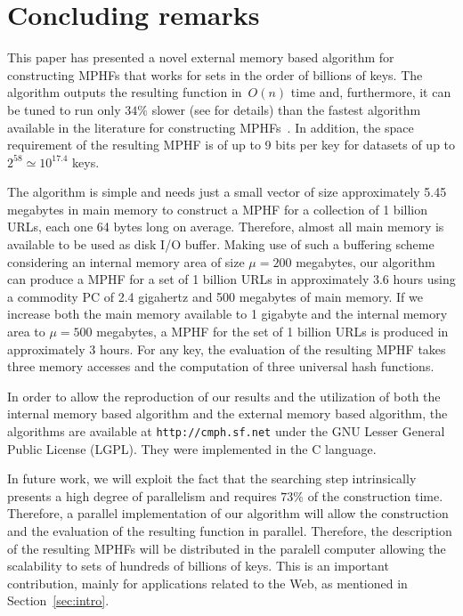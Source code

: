 \enlargethispage{2\baselineskip}
\section{Concluding remarks}
\label{sec:concuding-remarks}

This paper has presented a novel external memory based algorithm for
constructing MPHFs that works for sets in the order of billions of keys.  The
algorithm outputs the resulting function in~$O(n)$ time and, furthermore, it
can be tuned to run only $34\%$ slower (see \cite{bkz06t} for details) than the fastest 
algorithm available in the literature for constructing MPHFs~\cite{bkz05}.  
In addition, the space
requirement of the resulting MPHF is of up to 9 bits per key for datasets of
up to $2^{58}\simeq10^{17.4}$ keys. 
 
The algorithm is simple and needs just a
small vector of size approximately 5.45 megabytes in main memory to construct
a MPHF for a collection of 1 billion URLs, each one 64 bytes long on average.
Therefore, almost all main memory is available to be used as disk I/O buffer.
Making use of such a buffering scheme considering an internal memory area of size
$\mu=200$ megabytes, our algorithm can produce a MPHF for a
set of 1 billion URLs in approximately 3.6 hours using a commodity PC of 2.4 gigahertz and
500 megabytes of main memory.  
If we increase both the main memory
available to 1 gigabyte and the internal memory area to $\mu=500$ megabytes, 
a MPHF for the set of 1 billion URLs is produced in approximately 3 hours. For any
key, the evaluation of the resulting MPHF takes three memory accesses and the
computation of three universal hash functions. 

In order to allow the reproduction of our results and the utilization of both the internal memory
based algorithm and the external memory based algorithm,
the algorithms are available at \texttt{http://cmph.sf.net}
under the GNU Lesser General Public License (LGPL).
They were implemented in the C language.

In future work, we will exploit the fact that the searching step intrinsically
presents a high degree of parallelism and requires $73\%$ of the
construction time.  Therefore, a parallel implementation of our algorithm will
allow the construction and the evaluation of the resulting function in parallel.
Therefore, the description of the resulting MPHFs will be distributed in the paralell 
computer allowing the scalability to sets of hundreds of billions of keys. 
This is an important contribution, mainly for applications related to the Web, as 
mentioned in Section~\ref{sec:intro}.